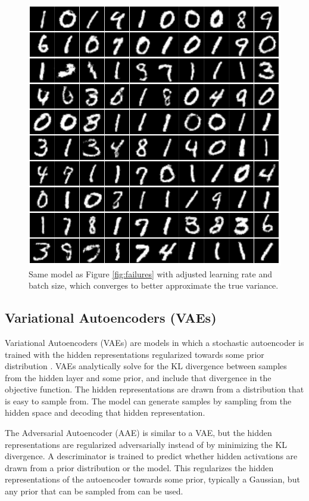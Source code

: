 \documentclass{article}
\begin{document}
\begin{figure}[h]
\caption{Same model as Figure \ref{fig:failures} with adjusted learning rate and batch size, which converges to better approximate the true variance. }
\label{fig:gan}
\includegraphics[scale=0.3]{images/success.png}
\centering
\end{figure}

\subsection{Variational Autoencoders (VAEs)}



Variational Autoencoders (VAEs) are models in which a stochastic autoencoder is trained with the hidden representations regularized towards some prior distribution \cite{Doersch2016}. VAEs analytically solve for the KL divergence between samples from the hidden layer and some prior, and include that divergence in the objective function. The hidden representations are drawn from a distribution that is easy to sample from. The model can generate samples by sampling from the hidden space and decoding that hidden representation.

The Adversarial Autoencoder (AAE) \cite{Makhzani2016} is similar to a VAE, but the hidden representations are regularized adversarially instead of by minimizing the KL divergence. A descriminator is trained to predict whether hidden activations are drawn from a prior distribution or the model. This regularizes the hidden representations of the autoencoder towards some prior, typically a Gaussian, but any prior that can be sampled from can be used. 
\end{document}
